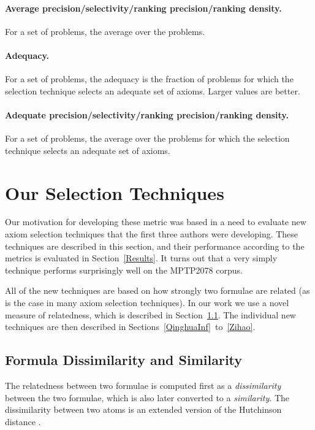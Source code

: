 \documentclass[EPiC]{easychair}
\begin{document}
\paragraph{Average precision/selectivity/ranking precision/ranking density.}
For a set of problems, the average over the problems.

\paragraph{Adequacy.}
For a set of problems, the adequacy is the fraction of problems for which
the selection technique selects an adequate set of axioms.
Larger values are better.

\paragraph{Adequate precision/selectivity/ranking precision/ranking density.}
For a set of problems, the average over the problems for which the selection 
technique selects an adequate set of axioms.

\section{Our Selection Techniques}
\label{Ours}

Our motivation for developing these metric was based in a need to evaluate
new axiom selection techniques that the first three authors were developing.
These techniques are described in this section, and their performance
according to the metrics is evaluated in Section~\ref{Results}.
It turns out that a very simply technique performs surprisingly well
on the MPTP2078 corpus.

All of the new techniques are based on how strongly two formulae are
related (as is the case in many axiom selection techniques).
In our work we use a novel measure of relatedness, which is described
in Section~\ref{QinghuaDistance}.
The individual new techniques are then described in 
Sections~\ref{QinghuaInf}~to~\ref{Zihao}.

\subsection{Formula Dissimilarity and Similarity}
\label{QinghuaDistance}

The relatedness between two formulae is computed first as a
\emph{dissimilarity} between the two formulae, which is also later converted
to a \emph{similarity}.
The dissimilarity between two atoms is an extended version of the
Hutchinson distance \cite{Hut97}.
\end{document}
